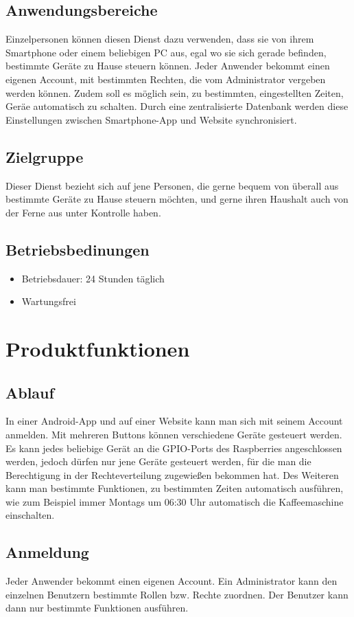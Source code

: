 \documentclass[10pt,a4paper]{report}
\begin{document}
\subsection{Anwendungsbereiche}
Einzelpersonen können diesen Dienst dazu verwenden, dass sie von ihrem Smartphone oder einem beliebigen PC aus, egal wo sie sich gerade befinden, bestimmte Geräte zu Hause steuern können. Jeder Anwender bekommt einen eigenen Account, mit bestimmten Rechten, die vom Administrator vergeben werden können.
Zudem soll es möglich sein, zu bestimmten, eingestellten Zeiten, Geräe automatisch zu schalten. Durch eine zentralisierte Datenbank werden diese Einstellungen zwischen Smartphone-App und Website synchronisiert.

\subsection{Zielgruppe}
Dieser Dienst bezieht sich auf jene Personen, die gerne bequem von überall aus bestimmte Geräte zu Hause steuern möchten, und gerne ihren Haushalt auch von der Ferne aus unter Kontrolle haben.


\subsection{Betriebsbedinungen}
\begin{itemize}
\item Betriebsdauer: 24 Stunden täglich
\item Wartungsfrei
\end{itemize}

\section{Produktfunktionen}
\subsection{Ablauf}
In einer Android-App und auf einer Website kann man sich mit seinem Account anmelden. Mit mehreren Buttons können verschiedene Geräte gesteuert werden. Es kann jedes beliebige Gerät an die GPIO-Ports des Raspberries angeschlossen werden, jedoch dürfen nur jene Geräte gesteuert werden, für die man die Berechtigung in der Rechteverteilung zugewießen bekommen hat. Des Weiteren kann man bestimmte Funktionen, zu bestimmten Zeiten automatisch ausführen, wie zum Beispiel immer Montags um 06:30 Uhr automatisch die Kaffeemaschine einschalten.

\subsection{Anmeldung}
Jeder Anwender bekommt einen eigenen Account. Ein Administrator kann den einzelnen Benutzern bestimmte Rollen bzw. Rechte zuordnen. Der Benutzer kann dann nur bestimmte Funktionen ausführen.
\end{document}
